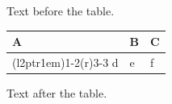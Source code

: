 \documentclass[12pt]{article}
\begin{document}
Text before the table.

\begin{tabular}{lll}\toprule A & B & C\\\cmidrule(l{2pt}r{1em}){1-2}\cmidrule(r){3-3} d & e & f\\\bottomrule\end{tabular}

Text after the table.
\end{document}
